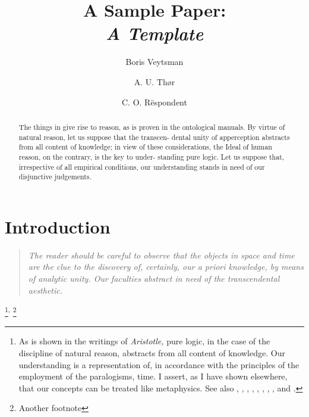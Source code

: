 \documentclass{resphilosophica}
\title[A Sample Paper: A Template]{A Sample Paper:\\ \emph{A
  Template}}
\author{Boris Veytsman}
\author{A. U. Th{\o}r}
\author{C. O. R\"espondent}
\begin{document}
%
%
%

\begin{abstract}
  The things in  give rise to reason, as is 
  proven in the ontological manuals. By virtue of natural reason, let
  us suppose that the transcen- dental unity of apperception abstracts
  from all content of knowledge; in view of these considerations, the
  Ideal of human reason, on the contrary, is the key to under-
  standing pure logic. Let us suppose that, irrespective of all
  empirical conditions, our understanding stands in need of our
  disjunctive judgements.
\end{abstract}
\maketitle

\kant[4]

\setcounter{footnote}{0}

\section{Introduction}
\label{sec:intro}

\begin{quotation}
  \em
  The reader should be careful to observe that the objects in
  space and time are the clue to the discovery of, certainly,
  our a priori knowledge, by means of analytic unity. Our
  faculties abstract  in
   need of  the transcendental aesthetic. 
  \em \citep{Gregorio:Kantlipsum}
\end{quotation}

\bigskip
\noindent %
\kant[2-4]\kant[34]

\kant*[7]\footnote{As is shown in the writings of \emph{Aristotle,} pure
  logic, in the case of the discipline of natural reason, abstracts
  from all content of knowledge. Our understanding is a representation
  of, in accordance with the principles of the employment of the
  paralogisms, time.  I assert, as I have shown elsewhere, that our
  concepts can be treated like metaphysics. See also \citep{Landau5},
  \citep{Hoff10}, \citep{Rao07:BeliefPropagation}, \citep{faga06a},
  \citep{bochnga}, \citep{aqui51a}, \citep{Mapas12}, \citep{ande97a},
  \citep{irig93a}
  and \citep{Knuth94:TheTeXbook}.}\textsuperscript{, }\footnote{Another footnote} 
\end{document}
